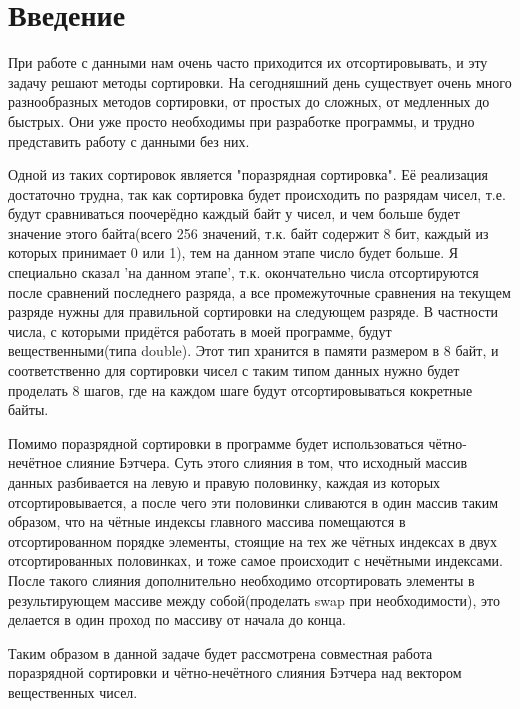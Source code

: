 \documentclass{report}
\begin{document}
\setcounter{page}{2}

\tableofcontents
\newpage

\section*{Введение}
При работе с данными нам очень часто приходится их отсортировывать, и эту задачу решают методы сортировки. На сегодняшний день существует очень много разнообразных методов сортировки, от простых до сложных, от медленных до быстрых. Они уже просто необходимы при разработке программы, и трудно представить работу с данными без них.

\par Одной из таких сортировок является "поразрядная сортировка". Её реализация достаточно трудна, так как сортировка будет происходить по разрядам чисел, т.е. будут сравниваться поочерёдно каждый байт у чисел, и чем больше будет значение этого байта(всего 256 значений, т.к. байт содержит 8 бит, каждый из которых принимает 0 или 1), тем на данном этапе число будет больше. Я специально сказал 'на данном этапе', т.к. окончательно числа отсортируются после сравнений последнего разряда, а все промежуточные сравнения на текущем разряде нужны для правильной сортировки на следующем разряде. В частности числа, с которыми придётся работать в моей программе, будут вещественными(типа double). Этот тип хранится в памяти размером в 8 байт, и соответственно для сортировки чисел с таким типом данных нужно будет проделать 8 шагов, где на каждом шаге будут отсортировываться кокретные байты.

\par Помимо поразрядной сортировки в программе будет использоваться чётно-нечётное слияние Бэтчера. Суть этого слияния в том, что исходный массив данных разбивается на левую и правую половинку, каждая из которых отсортировывается, а после чего эти половинки сливаются в один массив таким образом, что на чётные индексы главного массива помещаются в отсортированном порядке элементы, стоящие на тех же чётных индексах в двух отсортированных половинках, и тоже самое происходит с нечётными индексами. После такого слияния дополнительно необходимо отсортировать элементы в результирующем массиве между собой(проделать swap при необходимости), это делается в один проход по массиву от начала до конца.

\par Таким образом в данной задаче будет рассмотрена совместная работа поразрядной сортировки и чётно-нечётного слияния Бэтчера над вектором вещественных чисел. 
\end{document}
